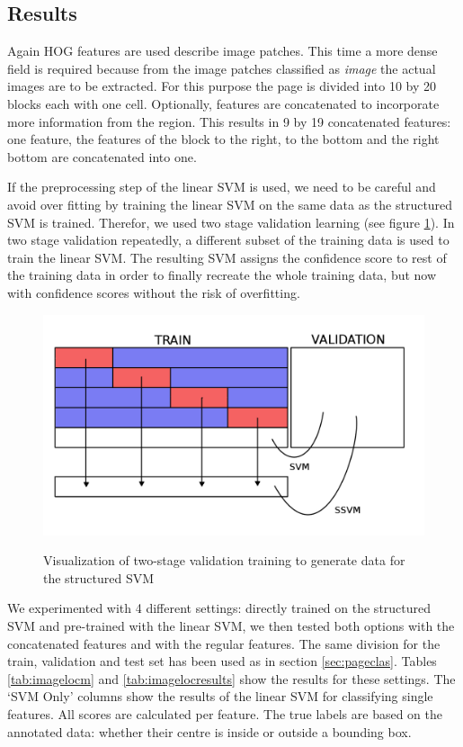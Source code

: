 \subsection{Results}
\label{subsec:imagelocresults}

Again HOG features are used describe image patches. This time a more dense field
is required because from the image patches classified as \emph{image} the actual
images are to be extracted. For this purpose the page is divided into 10 by 20
blocks each with one cell. Optionally, features are concatenated to incorporate
more information from the region. This results in 9 by 19 concatenated
features: one feature, the features of the block to the right, to the bottom and
the right bottom are concatenated into one.

If the preprocessing step of the linear SVM is used, we need to be careful and
avoid over fitting by training the linear SVM on the same data as the structured
SVM is trained. Therefor, we used two stage validation learning (see figure
\ref{fig:twostage}). In two stage validation repeatedly, a different subset of
the training data is used to train the linear SVM. The resulting SVM assigns the
confidence score to rest of the training data in order to finally recreate the
whole training data, but now with confidence scores without the risk of
overfitting.

\begin{figure}
\includegraphics[width=.5\textwidth]{resources/twostage}
\label{fig:twostage}
\caption{Visualization of two-stage validation training to generate data for the
structured SVM}
\end{figure}

We experimented with 4 different settings: directly trained on the structured
SVM and pre-trained with the linear SVM, we then tested both options with the
concatenated features and with the regular features. The same division for the
train, validation and test set has been used as in section \ref{sec:pageclas}.
Tables \ref{tab:imagelocm} and \ref{tab:imagelocresults} show the results for
these settings. The `SVM Only' columns show the results of the
linear SVM for classifying single features. All scores are calculated per
feature. The true labels are based on the annotated data: whether their centre
is inside or outside a bounding box.

